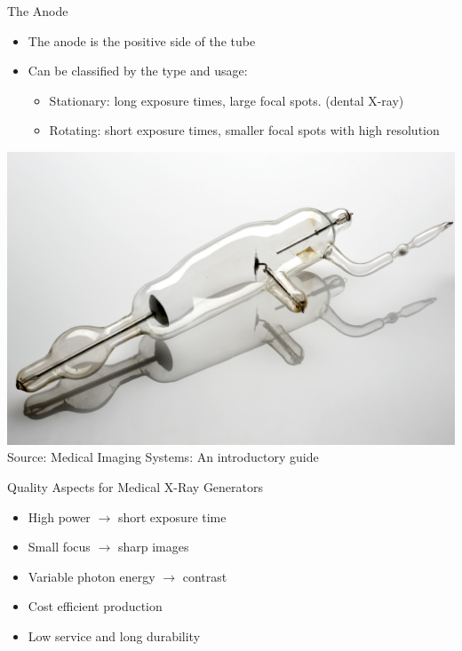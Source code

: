 \begin{frame}[c]{The Anode}
    \begin{itemize}
        \item The anode is the positive side of the tube
        \item Can be classified by the type and usage:
              \begin{itemize}
                  \item Stationary: long exposure times, large focal spots. (dental X-ray)
                  \item Rotating: short exposure times, smaller focal spots with high resolution
              \end{itemize}

    \end{itemize}
    \centering
    \includegraphics[height=0.6\textheight]{images/x-ray_tube.jpg}\\[-0.5\baselineskip]
    {\tiny Source: Medical Imaging Systems: An introductory guide~\cite{Berger2018}}


\end{frame}


\begin{frame}[t]{Quality Aspects for Medical X-Ray Generators}
    \begin{itemize}
        \setlength\itemsep{0.4cm}
        \item High power $\longrightarrow$ short exposure time
        \item Small focus $\longrightarrow$ sharp images
        \item Variable photon energy $\longrightarrow$ contrast
        \item Cost efficient production
        \item Low service and long durability
    \end{itemize}
\end{frame}

